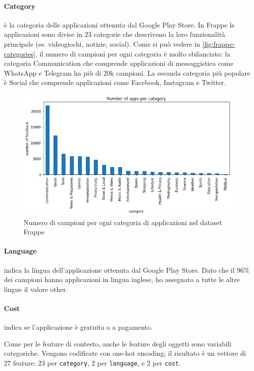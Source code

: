 \documentclass[12pt,italian]{report}
\begin{document}
\paragraph{Category} è la categoria delle applicazioni ottenuta dal Google Play Store. In Frappe le applicazioni sono divise in 23 categorie che descrivono la loro funzionalità principale (es. videogiochi, notizie, social). Come si può vedere in \autoref{fig:frappe-categories}, il numero di campioni per ogni categoria è molto sbilanciato: la categoria Communication che comprende applicazioni di messaggistica come WhatsApp e Telegram ha più di 20k campioni. La seconda categoria più popolare è Social che comprende applicazioni come Facebook, Instagram e Twitter.
\begin{figure}
  \centering
  \includegraphics[width=\linewidth]{immagini/frappe-category.png}
  \caption{Numero di campioni per ogni categoria di applicazioni nel dataset Frappe}
  \label{fig:frappe-categories}
\end{figure}

\paragraph{Language} indica la lingua dell'applicazione ottenuta dal Google Play Store. Dato che il 96\% dei campioni hanno applicazioni in lingua inglese, ho assegnato a tutte le altre lingue il valore other.

\paragraph{Cost} indica se l'applicazione è gratuita o a pagamento.

\bigskip \noindent
Come per le feature di contesto, anche le feature degli oggetti sono variabili categoriche. Vengono codificate con one-hot encoding; il risultato è un vettore di 27 feature: 23 per \texttt{category}, 2 per \texttt{language}, e 2 per \texttt{cost}.
\end{document}
